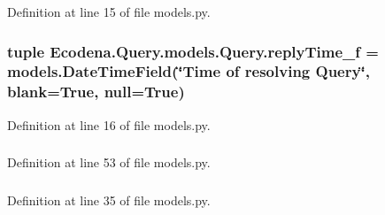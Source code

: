 Definition at line 15 of file models.py.

\hypertarget{class_ecodena_1_1_query_1_1models_1_1_query_a45776c99ebfd110c2d178c1223ddb886}{
\subsubsection[{replyTime\_\-f}]{\setlength{\rightskip}{0pt plus 5cm}tuple {\bf Ecodena.Query.models.Query.replyTime\_\-f} = models.DateTimeField(\char`\"{}Time of resolving {\bf Query}\char`\"{}, blank=True, null=True)}}
\label{de/d81/class_ecodena_1_1_query_1_1models_1_1_query_a45776c99ebfd110c2d178c1223ddb886}


Definition at line 16 of file models.py.

\hypertarget{class_ecodena_1_1_query_1_1models_1_1_query_a00674f59fb454935d65e31924d8a9df2}{
\subsubsection[{replyTime\_\-f}]{}}
\label{de/d81/class_ecodena_1_1_query_1_1models_1_1_query_a00674f59fb454935d65e31924d8a9df2}


Definition at line 53 of file models.py.

\hypertarget{class_ecodena_1_1_query_1_1models_1_1_query_a7d3a9e3880479a39865780b2c1180709}{
\subsubsection[{solution\_\-f}]{}}
\label{de/d81/class_ecodena_1_1_query_1_1models_1_1_query_a7d3a9e3880479a39865780b2c1180709}


Definition at line 35 of file models.py.

